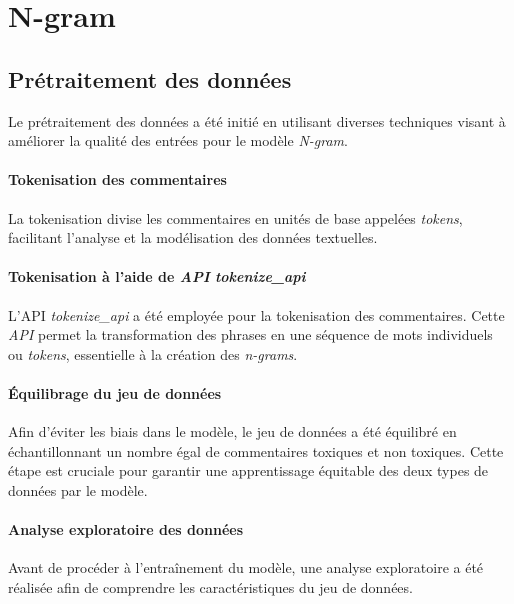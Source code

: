 \chapter{N-gram}

\section{Prétraitement des données}

Le prétraitement des données a été initié en utilisant diverses techniques visant à améliorer la qualité des entrées pour le modèle \textit{N-gram}.

\subsubsection{Tokenisation des commentaires}

La tokenisation divise les commentaires en unités de base appelées \textit{tokens}, facilitant l'analyse et la modélisation des données textuelles.

\subsubsection*{Tokenisation à l'aide de \textit{API} \textit{tokenize\_api}}

L'API \textit{tokenize\_api} a été employée pour la tokenisation des commentaires. Cette \textit{API} permet la transformation des phrases en une séquence de mots individuels ou \textit{tokens}, essentielle à la création des \textit{n-grams}.

\subsubsection*{Équilibrage du jeu de données}

Afin d'éviter les biais dans le modèle, le jeu de données a été équilibré en échantillonnant un nombre égal de commentaires toxiques et non toxiques. Cette étape est cruciale pour garantir une apprentissage équitable des deux types de données par le modèle.

\subsubsection{Analyse exploratoire des données}

Avant de procéder à l'entraînement du modèle, une analyse exploratoire a été réalisée afin de comprendre les caractéristiques du jeu de données.

